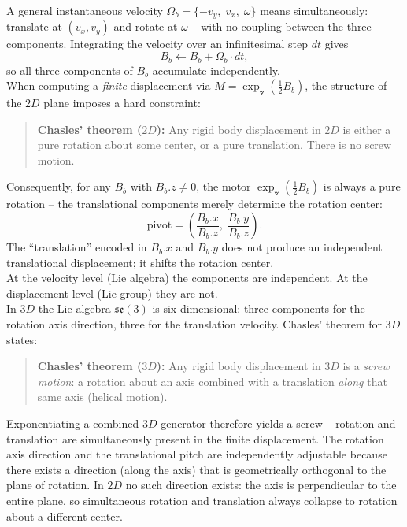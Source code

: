 A general instantaneous velocity $\Omega_b = \{-v_y,\; v_x,\; \omega\}$ means
simultaneously: translate at $(v_x, v_y)$ and rotate at $\omega$ -- with no coupling
between the three components. Integrating the velocity over an
infinitesimal step $dt$ gives
\begin{equation}
    B_b \leftarrow B_b + \Omega_b \cdot dt,
    \label{eq:lie_algebra_accumulation}
\end{equation}
so all three components of $B_b$ accumulate independently. \\

When computing a \emph{finite} displacement via $M = \exp_{\veedot}(\tfrac{1}{2} B_b)$,
the structure of the $2D$ plane imposes a hard constraint:

\begin{quote}
\textbf{Chasles' theorem ($2D$):} Any rigid body displacement in $2D$ is either a pure
rotation about some center, or a pure translation. There is no screw motion.
\end{quote}

Consequently, for any $B_b$ with $B_b.z \neq 0$, the motor $\exp_{\veedot}(\tfrac{1}{2}
B_b)$ is always a pure rotation -- the translational components merely determine
the rotation center:
\begin{equation}
    \text{pivot} = \left(\frac{B_b.x}{B_b.z},\;\frac{B_b.y}{B_b.z}\right).
    \label{eq:pivot_from_generator}
\end{equation}
The ``translation'' encoded in $B_b.x$ and $B_b.y$ does not produce an independent
translational displacement; it shifts the rotation center. \\

At the velocity level (Lie algebra) the components are independent. At the
displacement level (Lie group) they are not. \\

In $3D$ the Lie algebra $\mathfrak{se}(3)$ is six-dimensional: three components for the
rotation axis direction, three for the translation velocity. Chasles' theorem for $3D$
states:

\begin{quote}
\textbf{Chasles' theorem ($3D$):} Any rigid body displacement in $3D$ is a \emph{screw
motion}: a rotation about an axis combined with a translation \emph{along} that same axis
(helical motion).
\end{quote}

Exponentiating a combined $3D$ generator therefore yields a screw -- rotation and
translation are simultaneously present in the finite displacement. The rotation axis
direction and the translational pitch are independently adjustable because there exists a
direction (along the axis) that is geometrically orthogonal to the plane of rotation. In
$2D$ no such direction exists: the axis is perpendicular to the entire plane, so
simultaneous rotation and translation always collapse to rotation about a different
center. \\

